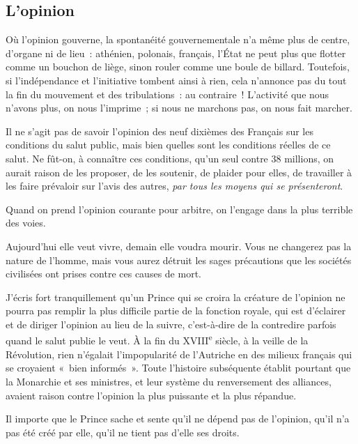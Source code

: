 \documentclass[french,twoside]{book} %
\newcommand{\astermono}{\medskip\centerline{\color{rubric}\large\selectfont{\syms ✻}}\medskip\par}%
\begin{document}
\astermono

\subsection[L’opinion]{L’opinion}
\noindent Où l’opinion gouverne, la spontanéité gouvernementale n’a même plus de centre, d’organe ni de lieu : athénien, polonais, français, l’État ne peut plus que flotter comme un bouchon de liège, sinon rouler comme une boule de billard. Toutefois, si l’indépendance et l’initiative tombent ainsi à rien, cela n’annonce pas du tout la fin du mouvement et des tribulations : au contraire ! L’activité que nous n’avons plus, on nous l’imprime ; si nous ne marchons pas, on nous fait marcher.\par

\astermono

\noindent Il ne s’agit pas de savoir l’opinion des neuf dixièmes des Français sur les conditions du salut public, mais bien quelles sont les conditions réelles de ce salut. Ne fût-on, à connaître ces conditions, qu’un seul contre 38 millions, on aurait raison de les proposer, de les soutenir, de plaider pour elles, de travailler à les faire prévaloir sur l’avis des autres, \emph{par tous les moyens qui se présenteront}.\par

\astermono

\noindent Quand on prend l’opinion courante pour arbitre, on l’engage dans la plus terrible des voies.\par
Aujourd’hui elle veut vivre, demain elle voudra mourir. Vous ne changerez pas la nature de l’homme, mais vous aurez détruit les sages précautions que les sociétés civilisées ont prises contre ces causes de mort.\par

\astermono

\noindent J’écris fort tranquillement qu’un Prince qui se croira la créature de l’opinion ne pourra pas remplir la plus difficile partie de la fonction royale, qui est d’éclairer et de diriger l’opinion au lieu de la suivre, c’est-à-dire de la contredire parfois quand le salut publie le veut. À la fin du XVIII\textsuperscript{e} siècle, à la veille de la Révolution, rien n’égalait l’impopularité de l’Autriche en des milieux français qui se croyaient « bien informés ». Toute l’histoire subséquente établit pourtant que la Monarchie et ses ministres, et leur système du renversement des alliances, avaient raison contre l’opinion la plus puissante et la plus répandue.\par
Il importe que le Prince sache et sente qu’il ne dépend pas de l’opinion, qu’il n’a pas été créé par elle, qu’il ne tient pas d’elle ses droits.
\end{document}

